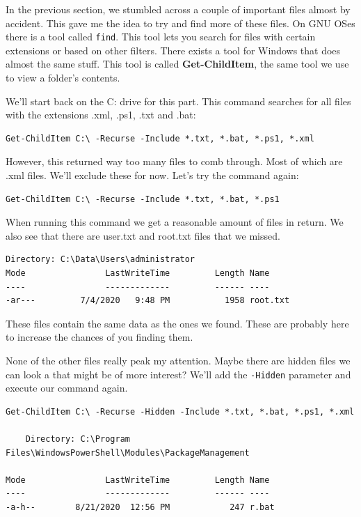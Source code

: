 \documentclass[../main.tex]{subfiles}
\begin{document}
In the previous section, we stumbled across a couple of important files almost by accident. This gave me the idea to try and find more of these files. On GNU OSes there is a tool called \lstinline{find}. This tool lets you search for files with certain extensions or based on other filters. There exists a tool for Windows that does almost the same stuff. This tool is called \textbf{Get-ChildItem}, the same tool we use to view a folder's contents.

We'll start back on the C: drive for this part. This command searches for all files with the extensions .xml, .ps1, .txt and .bat:

\begin{lstlisting}
Get-ChildItem C:\ -Recurse -Include *.txt, *.bat, *.ps1, *.xml
\end{lstlisting}

However, this returned way too many files to comb through. Most of which are .xml files. We'll exclude these for now. Let's try the command again:

\begin{lstlisting}
Get-ChildItem C:\ -Recurse -Include *.txt, *.bat, *.ps1
\end{lstlisting}

When running this command we get a reasonable amount of files in return. We also see that there are user.txt and root.txt files that we missed. 

\begin{lstlisting}
Directory: C:\Data\Users\administrator
Mode                LastWriteTime         Length Name                          
----                -------------         ------ ----                          
-ar---         7/4/2020   9:48 PM           1958 root.txt
\end{lstlisting}

These files contain the same data as the ones we found. These are probably here to increase the chances of you finding them.

None of the other files really peak my attention. Maybe there are hidden files we can look a that might be of more interest? We'll add the \lstinline{-Hidden} parameter and execute our command again.

\begin{lstlisting}
Get-ChildItem C:\ -Recurse -Hidden -Include *.txt, *.bat, *.ps1, *.xml

    Directory: C:\Program Files\WindowsPowerShell\Modules\PackageManagement

Mode                LastWriteTime         Length Name                          
----                -------------         ------ ----                          
-a-h--        8/21/2020  12:56 PM            247 r.bat
\end{lstlisting}
\end{document}

